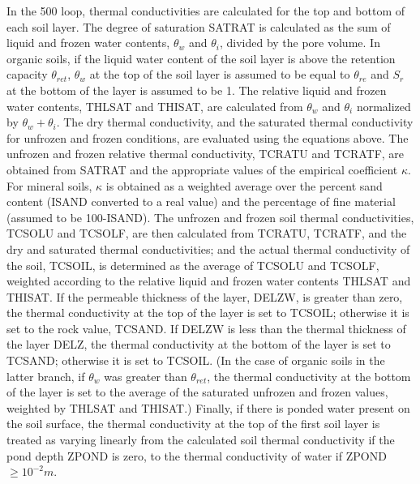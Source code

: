 In the 500 loop, thermal conductivities are calculated for the top and bottom of each soil layer. The degree of saturation S\+A\+T\+R\+A\+T is calculated as the sum of liquid and frozen water contents, $\theta_w$ and $\theta_i$, divided by the pore volume. In organic soils, if the liquid water content of the soil layer is above the retention capacity $\theta_{ret}$, $\theta_w$ at the top of the soil layer is assumed to be equal to $\theta_{re}$ and $S_r$ at the bottom of the layer is assumed to be 1. The relative liquid and frozen water contents, T\+H\+L\+S\+A\+T and T\+H\+I\+S\+A\+T, are calculated from $\theta_w$ and $\theta_i$ normalized by $\theta_w + \theta_i$. The dry thermal conductivity, and the saturated thermal conductivity for unfrozen and frozen conditions, are evaluated using the equations above. The unfrozen and frozen relative thermal conductivity, T\+C\+R\+A\+T\+U and T\+C\+R\+A\+T\+F, are obtained from S\+A\+T\+R\+A\+T and the appropriate values of the empirical coefficient $\kappa$. For mineral soils, $\kappa$ is obtained as a weighted average over the percent sand content (I\+S\+A\+N\+D converted to a real value) and the percentage of fine material (assumed to be 100-\/\+I\+S\+A\+N\+D). The unfrozen and frozen soil thermal conductivities, T\+C\+S\+O\+L\+U and T\+C\+S\+O\+L\+F, are then calculated from T\+C\+R\+A\+T\+U, T\+C\+R\+A\+T\+F, and the dry and saturated thermal conductivities; and the actual thermal conductivity of the soil, T\+C\+S\+O\+I\+L, is determined as the average of T\+C\+S\+O\+L\+U and T\+C\+S\+O\+L\+F, weighted according to the relative liquid and frozen water contents T\+H\+L\+S\+A\+T and T\+H\+I\+S\+A\+T. If the permeable thickness of the layer, D\+E\+L\+Z\+W, is greater than zero, the thermal conductivity at the top of the layer is set to T\+C\+S\+O\+I\+L; otherwise it is set to the rock value, T\+C\+S\+A\+N\+D. If D\+E\+L\+Z\+W is less than the thermal thickness of the layer D\+E\+L\+Z, the thermal conductivity at the bottom of the layer is set to T\+C\+S\+A\+N\+D; otherwise it is set to T\+C\+S\+O\+I\+L. (In the case of organic soils in the latter branch, if $\theta_w$ was greater than $\theta_{ret}$, the thermal conductivity at the bottom of the layer is set to the average of the saturated unfrozen and frozen values, weighted by T\+H\+L\+S\+A\+T and T\+H\+I\+S\+A\+T.) Finally, if there is ponded water present on the soil surface, the thermal conductivity at the top of the first soil layer is treated as varying linearly from the calculated soil thermal conductivity if the pond depth Z\+P\+O\+N\+D is zero, to the thermal conductivity of water if Z\+P\+O\+N\+D $\geq 10^{-2} m$.

